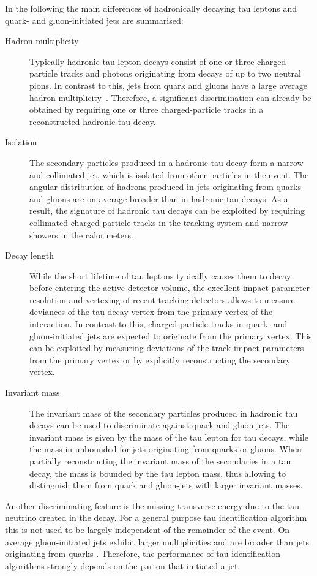 In the following the main differences of hadronically decaying tau leptons and
quark- and gluon-initiated jets are summarised:
\begin{description}
\item[Hadron multiplicity] Typically hadronic tau lepton decays consist of one
  or three charged-particle tracks and photons originating from decays of up to
  two neutral pions. In contrast to this, jets from quark and gluons have a
  large average hadron multiplicity~\cite{ellis_stirling_webber}. Therefore, a
  significant discrimination can already be obtained by requiring one or three
  charged-particle tracks in a reconstructed hadronic tau decay.

\item[Isolation] The secondary particles produced in a hadronic tau decay form a
  narrow and collimated jet, which is isolated from other particles in the
  event. The angular distribution of hadrons produced in jets originating from
  quarks and gluons are on average broader than in hadronic tau decays. As a
  result, the signature of hadronic tau decays can be exploited by requiring
  collimated charged-particle tracks in the tracking system and narrow showers
  in the calorimeters.

\item[Decay length] While the short lifetime of tau leptons typically causes
  them to decay before entering the active detector volume, the excellent impact
  parameter resolution and vertexing of recent tracking detectors allows to
  measure deviances of the tau decay vertex from the primary vertex of the
  interaction. In contrast to this, charged-particle tracks in quark- and
  gluon-initiated jets are expected to originate from the primary vertex. This
  can be exploited by measuring deviations of the track impact parameters from
  the primary vertex or by explicitly reconstructing the secondary vertex.

\item[Invariant mass] The invariant mass of the secondary particles produced in
  hadronic tau decays can be used to discriminate against quark and gluon-jets.
  The invariant mass is given by the mass of the tau lepton for tau decays,
  while the mass in unbounded for jets originating from quarks or gluons. When
  partially reconstructing the invariant mass of the secondaries in a tau decay,
  the mass is bounded by the tau lepton mass, thus allowing to distinguish them
  from quark and gluon-jets with larger invariant masses.

\end{description}
Another discriminating feature is the missing transverse energy due to the tau
neutrino created in the decay. For a general purpose tau identification
algorithm this is not used to be largely independent of the remainder of the
event. On average gluon-initiated jets exhibit larger multiplicities and are
broader than jets originating from quarks \cite{ellis_stirling_webber}.
Therefore, the performance of tau identification algorithms strongly depends on
the parton that initiated a jet.

